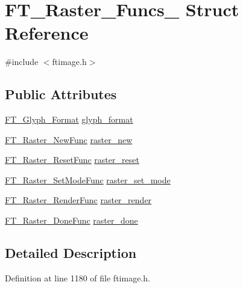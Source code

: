\hypertarget{struct_f_t___raster___funcs__}{}\section{F\+T\+\_\+\+Raster\+\_\+\+Funcs\+\_\+ Struct Reference}
\label{struct_f_t___raster___funcs__}


{\ttfamily \#include $<$ftimage.\+h$>$}

\subsection*{Public Attributes}
\begin{DoxyCompactItemize}
\item 
\mbox{\hyperlink{ftimage_8h_aeca0d10a27aedecbf96515e0628aff1f}{F\+T\+\_\+\+Glyph\+\_\+\+Format}} \mbox{\hyperlink{struct_f_t___raster___funcs___a741b43afa16f1f1b7f633cebd9f1d6a9}{glyph\+\_\+format}}
\item 
\mbox{\hyperlink{ftimage_8h_acfff989cc4f373de6211b12c97a265e8}{F\+T\+\_\+\+Raster\+\_\+\+New\+Func}} \mbox{\hyperlink{struct_f_t___raster___funcs___a31c9df9af6636df8a17a11bcd921b6a4}{raster\+\_\+new}}
\item 
\mbox{\hyperlink{ftimage_8h_a0ae680a37517fe355321f780123d12f6}{F\+T\+\_\+\+Raster\+\_\+\+Reset\+Func}} \mbox{\hyperlink{struct_f_t___raster___funcs___a91e9decd6066090a5f306f33f9815d39}{raster\+\_\+reset}}
\item 
\mbox{\hyperlink{ftimage_8h_a959011dc7420bae5989460bfd0727bd1}{F\+T\+\_\+\+Raster\+\_\+\+Set\+Mode\+Func}} \mbox{\hyperlink{struct_f_t___raster___funcs___a3b37c781e54cf933cb60f57f2d45b32c}{raster\+\_\+set\+\_\+mode}}
\item 
\mbox{\hyperlink{ftimage_8h_a4da783a601182e9e5b9d75584fd814ec}{F\+T\+\_\+\+Raster\+\_\+\+Render\+Func}} \mbox{\hyperlink{struct_f_t___raster___funcs___a7479a3def4522ce2667d6772e7bb96a5}{raster\+\_\+render}}
\item 
\mbox{\hyperlink{ftimage_8h_a2df7d8d26927263fc038263851b18cf6}{F\+T\+\_\+\+Raster\+\_\+\+Done\+Func}} \mbox{\hyperlink{struct_f_t___raster___funcs___aecfd50bb6567d4442c997467cd68c857}{raster\+\_\+done}}
\end{DoxyCompactItemize}


\subsection{Detailed Description}


Definition at line 1180 of file ftimage.\+h.



